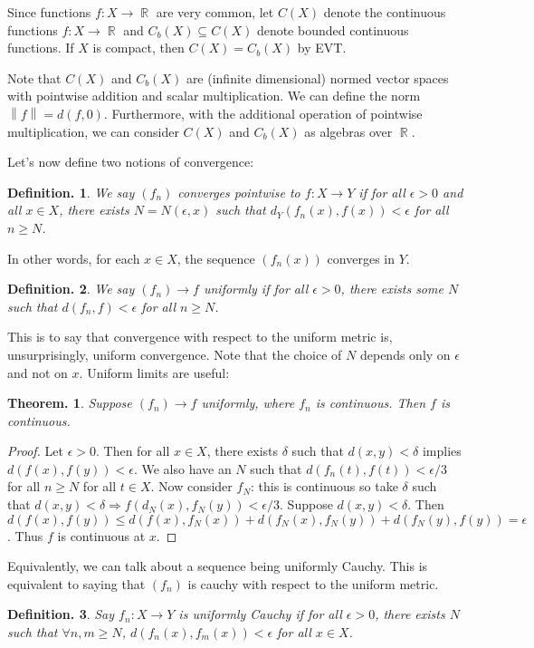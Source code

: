 \documentclass[11pt, a4paper]{memoir}
\DeclareMathOperator{\R}{{\mathbb{R}}}
\newcommand{\norm}[1]{\ensuremath{\left\lVert#1\right\rVert}}
\theoremstyle{change}
\newtheorem{theorem}{Theorem.}[section]
\theoremstyle{plain}
\theoremstyle{nonumberplain}
\newtheorem{definition}{Definition.}
\newtheorem{proof}{Proof}
\numberwithin{equation}{section}
\begin{document}
Since functions $f:X\to\R$ are very common, let $C(X)$ denote the continuous functions $f:X\to\R$ and $C_b(X)\subseteq C(X)$ denote bounded continuous functions.
If $X$ is compact, then $C(X)=C_b(X)$ by EVT.

Note that $C(X)$ and $C_b(X)$ are (infinite dimensional) normed vector spaces with pointwise addition and scalar multiplication.
We can define the norm $\norm{f}=d(f,0)$.
Furthermore, with the additional operation of pointwise multiplication, we can consider $C(X)$ and $C_b(X)$ as algebras over $\R$.

Let's now define two notions of convergence:
\begin{definition}
    We say $(f_n)$ converges pointwise to $f:X\to Y$ if for all $\epsilon>0$ and all $x\in X$, there exists $N=N(\epsilon,x)$
    such that $d_Y(f_n(x),f(x))<\epsilon$ for all $n\geq N$.
\end{definition}
In other words, for each $x\in X$, the sequence $(f_n(x))$ converges in $Y$.
\begin{definition}
    We say $(f_n)\to f$ uniformly if for all $\epsilon>0$, there exists some $N$ such that $d(f_n,f)<\epsilon$ for all $n\geq N$.
\end{definition}
This is to say that convergence with respect to the uniform metric is, unsurprisingly, uniform convergence.
Note that the choice of $N$ depends only on $\epsilon$ and not on $x$.
Uniform limits are useful:
\begin{theorem}
    Suppose $(f_n)\to f$ uniformly, where $f_n$ is continuous.
    Then $f$ is continuous.
\end{theorem}
\begin{proof}
    Let $\epsilon>0$. Then for all $x\in X$, there exists $\delta$ such that $d(x,y)<\delta$ implies $d(f(x),f(y))<\epsilon$.
    We also have an $N$ such that $d(f_n(t),f(t))<\epsilon/3$ for all $n\geq N$ for all $t\in X$. Now consider $f_N$:
    this is continuous so take $\delta$ such that $d(x,y)<\delta\Rightarrow f(d_N(x),f_N(y))<\epsilon/3$. Suppose
    $d(x,y)<\delta$. Then $d(f(x),f(y))\leq d(f(x),f_N(x))+d(f_N(x),f_N(y))+d(f_N(y),f(y))=\epsilon$. Thus $f$ is continuous
    at $x$.
\end{proof}
Equivalently, we can talk about a sequence being uniformly Cauchy.
This is equivalent to saying that $(f_n)$ is cauchy with respect to the uniform metric.
\begin{definition}
    Say $f_n:X\to Y$ is uniformly Cauchy if for all $\epsilon>0$, there exists $N$ such that $\forall n,m\geq N$,
    $d(f_n(x),f_m(x))<\epsilon$ for all $x\in X$.
\end{definition}
\end{document}
